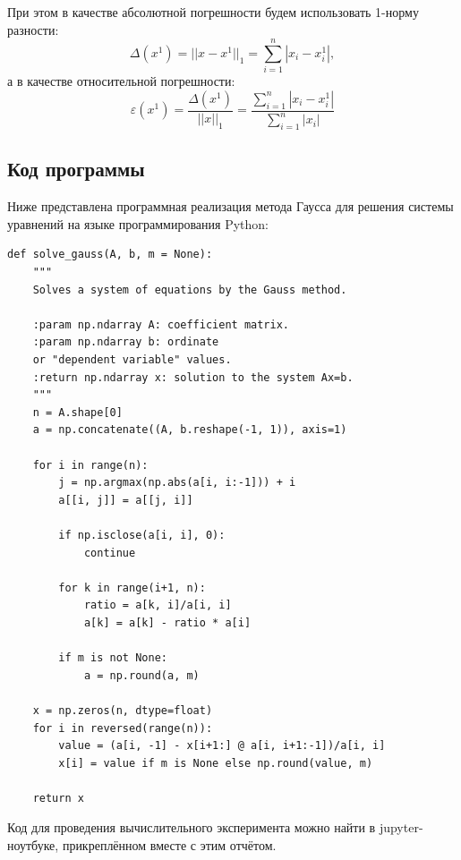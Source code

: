 \documentclass[12pt]{article}%
\begin{document}
При этом в качестве абсолютной погрешности будем использовать 1-норму разности:
\[
\Delta(x^1) = ||x - x^1 ||_1 = 
\sum\limits_{i=1}^{n}|x_{i} -  x_{i}^1|,
\]
а в качестве относительной погрешности:
\[
\varepsilon(x^1) = \frac{\Delta(x^1)}{||x||_1} = 
\frac{
\sum\limits_{i=1}^{n}|x_i - x_i^1|
}{
\sum\limits_{i=1}^{n}|x_i|
}
\]


\subsection{Код программы}
Ниже представлена программная реализация метода Гаусса для решения системы уравнений на языке программирования Python:
\begin{verbatim}
def solve_gauss(A, b, m = None):
    """
    Solves a system of equations by the Gauss method.

    :param np.ndarray A: coefficient matrix.
    :param np.ndarray b: ordinate 
    or "dependent variable" values.
    :return np.ndarray x: solution to the system Ax=b.
    """
    n = A.shape[0]
    a = np.concatenate((A, b.reshape(-1, 1)), axis=1)

    for i in range(n):
        j = np.argmax(np.abs(a[i, i:-1])) + i
        a[[i, j]] = a[[j, i]]

        if np.isclose(a[i, i], 0):
            continue

        for k in range(i+1, n):
            ratio = a[k, i]/a[i, i]
            a[k] = a[k] - ratio * a[i]

        if m is not None:
            a = np.round(a, m)
    
    x = np.zeros(n, dtype=float)
    for i in reversed(range(n)):
        value = (a[i, -1] - x[i+1:] @ a[i, i+1:-1])/a[i, i]
        x[i] = value if m is None else np.round(value, m)

    return x
\end{verbatim}
\FloatBarrier

Код для проведения вычислительного эксперимента можно найти в jupyter-ноутбуке, прикреплённом вместе с этим отчётом.
\end{document}
